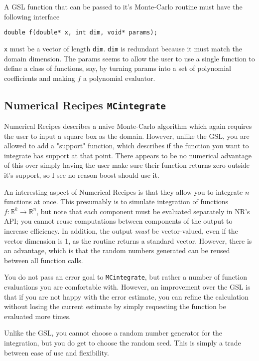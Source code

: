 \documentclass[landscape]{article}
\numberwithin{equation}{section}
\begin{document}
A GSL function that can be passed to it's Monte-Carlo routine must have the following interface

\begin{verbatim}
double f(double* x, int dim, void* params);
\end{verbatim}
\texttt{x} must be a vector of length \texttt{dim}.
\texttt{dim} is redundant because it must match the domain dimension.
The params seems to allow the user to use a single function to define a class of functions, say, by turning params into a set of polynomial coefficients and making $f$ a polynomial evaluator.

\subsection{Numerical Recipes \texttt{MCintegrate}}

Numerical Recipes describes a naive Monte-Carlo algorithm which again requires the user to input a square box as the domain.
However, unlike the GSL, you are allowed to add a "support" function, which describes if the function you want to integrate has support at that point.
There appears to be no numerical advantage of this over simply having the user make sure their function returns zero outside it's support, so I see no reason boost should use it.

An interesting aspect of Numerical Recipes is that they allow you to integrate $n$ functions at once.
This presumably is to simulate integration of functions $f\colon \mathbb{R}^{k} \to \mathbb{R}^{n}$, but note that each component must be evaluated separately in NR's API; you cannot reuse computations between components of the output to increase efficiency.
In addition, the output \emph{must} be vector-valued, even if the vector dimension is 1, as the routine returns a standard vector.
However, there is an advantage, which is that the random numbers generated can be reused between all function calls.

You do not pass an error goal to \texttt{MCintegrate}, but rather a number of function evaluations you are comfortable with.
However, an improvement over the GSL is that if you are not happy with the error estimate, you can refine the calculation without losing the current estimate by simply requesting the function be evaluated more times.

Unlike the GSL, you cannot choose a random number generator for the integration, but you do get to choose the random seed.
This is simply a trade between ease of use and flexibility.
\end{document}
